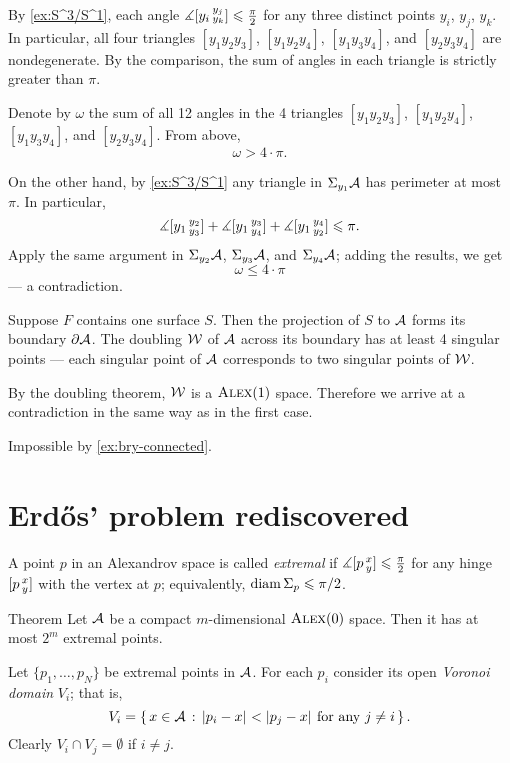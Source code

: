 By \ref{ex:S^3/S^1}, each angle $\measuredangle[y_i\,{}^{y_j}_{y_k}]\leqslant \tfrac\pi2$ for any three distinct points 
$y_i$, $y_j$, $y_k$.
In particular, all four triangles $[y_1y_2y_3]$, $[y_1y_2y_4]$, $[y_1y_3y_4]$, and $[y_2y_3y_4]$ are nondegenerate.
By the comparison, the sum of angles in each triangle is strictly greater than $\pi$.

Denote by $\omega$ the sum of all 12 angles in the 4 triangles $[y_1y_2y_3]$, $[y_1y_2y_4]$, $[y_1y_3y_4]$, and $[y_2y_3y_4]$.
From above,
\[\omega>4\cdot\pi.\]

On the other hand, by \ref{ex:S^3/S^1} any triangle in $\Sigma_{y_1}\mathcal{A}$ has perimeter at most $\pi$.
In particular, 
\[\measuredangle[y_1\,{}^{y_2}_{y_3}]+\measuredangle[y_1\,{}^{y_3}_{y_4}]+\measuredangle[y_1\,{}^{y_4}_{y_2}]\leqslant \pi.\]
Apply the same argument in $\Sigma_{y_2}\mathcal{A}$, $\Sigma_{y_3}\mathcal{A}$, and $\Sigma_{y_4}\mathcal{A}$;
adding the results, we get 
\[\omega\le 4\cdot\pi\]
--- a contradiction.

Suppose $F$ contains one surface $S$.
Then the projection of $S$ to $\mathcal{A}$ forms its boundary $\partial \mathcal{A}$.
The doubling $\mathcal{W}$ of $\mathcal{A}$ across its boundary has at least 4 singular points --- each singular point of $\mathcal{A}$ corresponds to two singular points of $\mathcal{W}$.

By the doubling theorem, $\mathcal{W}$ is a $\textsc{Alex}(1)$ space.
Therefore we arrive at a contradiction in the same way as in the first case.

 Impossible by \ref{ex:bry-connected}.
\qeds

\section{Erdős' problem rediscovered}

A point $p$ in an Alexandrov space is called \emph{extremal} if $\measuredangle[p\,{}^{x}_{y}]\leqslant \tfrac\pi2$ for any hinge $[p\,{}^{x}_{y}]$ with the vertex at $p$; equivalently, $\operatorname{\rm diam}\nolimits \Sigma_p\leqslant \pi/2$.

\begin{thm}{Theorem}\label{thm:extr-point}
Let $\mathcal{A}$ be a compact $m$-dimensional $\textsc{Alex}(0)$ space.
Then it has at most $2^m$ extremal points.
\end{thm}

Let $\{p_1,\dots,p_N\}$ be extremal points in $\mathcal{A}$.
For each $p_i$ consider its open \emph{Voronoi domain} $V_i$; that is, 
\[V_i=\set{x\in \spc{A}}{\dist{p_i}{x}{}<\dist{p_j}{x}{}\ \text{for any}\ j\not=i}.\]
Clearly $V_i\cap V_j=\emptyset$ if $i\not=j$.

